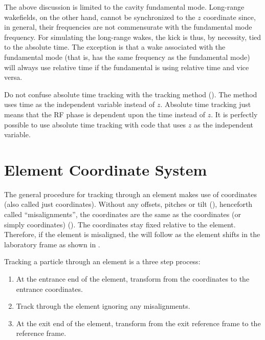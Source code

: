 The above discussion is limited to the cavity fundamental mode. Long-range wakefields, on the
other hand, cannot be synchronized to the $z$ coordinate since, in general, their frequencies are
not commensurate with the fundamental mode frequency. For simulating the long-range wakes, the kick
is thus, by necessity, tied to the absolute time. The exception is that a wake associated with the
fundamental mode (that is, has the same frequency as the fundamental mode) will always use relative
time if the fundamental is using relative time and vice versa.

Do not confuse absolute time tracking with the  tracking method
(). The  method uses time as the independent variable instead of
$z$. Absolute time tracking just means that the RF phase is dependent upon the time instead of
$z$. It is perfectly possible to use absolute time tracking with code that uses $z$ as the
independent variable.

\section{Element Coordinate System}
\label{s:ele.coords}

The general procedure for tracking through an element makes use of 
coordinates (also called just  coordinates). Without any offsets, pitches or tilt
(), henceforth called ``misalignments'', the  coordinates are the same as
the  coordinates (or simply  coordinates)
(). The  coordinates stay fixed relative to the element. Therefore, if the
element is misaligned, the  will follow as the element shifts in the
laboratory frame as shown in .

Tracking a particle through an element is a three step process:
\begin{enumerate}
\item
At the entrance end of the element, transform from the  coordinates to the entrance
 coordinates.
\item
Track through the element ignoring any misalignments. 
\item
At the exit end of the element, transform from the exit  reference frame to the
 reference frame.
\end{enumerate}

